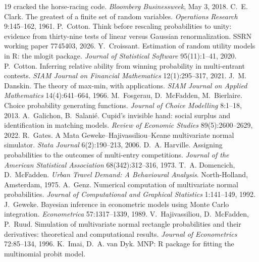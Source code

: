\documentclass[11pt]{article}
\begin{document}
\begin{thebibliography}{19}
cracked the horse-racing code. \emph{Bloomberg Businessweek}, May 3,
2018.
 C.~E. Clark.
The greatest of a finite set of random variables.
\emph{Operations Research} 9:145--162, 1961.
 P.~Cotton. Think before rescaling
probabilities to unity: evidence from thirty-nine tests of linear versus
Gaussian renormalization. SSRN working paper 7745403, 2026.
 Y.~Croissant.
Estimation of random utility models in R: the mlogit package.
\emph{Journal of Statistical Software} 95(11):1--41, 2020.
 P.~Cotton.
Inferring relative ability from winning probability in multi-entrant contests.
\emph{SIAM Journal on Financial Mathematics} 12(1):295--317, 2021.
 J.~M. Danskin. The theory of
max-min, with applications. \emph{SIAM Journal on Applied Mathematics}
14(4):641--664, 1966.
M.~Fosgerau, D.~McFadden, M.~Bierlaire. Choice probability generating
functions. \emph{Journal of Choice Modelling} 8:1--18, 2013.
 A.~Galichon,
B.~Salani\'e. Cupid's invisible hand: social surplus and identification in
matching models. \emph{Review of Economic Studies} 89(5):2600--2629, 2022.
 R.~Gates.
A Mata Geweke--Hajivassiliou--Keane multivariate normal simulator.
\emph{Stata Journal} 6(2):190--213, 2006.
 D.~A. Harville. Assigning
probabilities to the outcomes of multi-entry competitions.
\emph{Journal of the American Statistical Association}
68(342):312--316, 1973.
 T.~A. Domencich,
D.~McFadden. \emph{Urban Travel Demand: A Behavioural Analysis}.
North-Holland, Amsterdam, 1975.
 A.~Genz.
Numerical computation of multivariate normal probabilities.
\emph{Journal of Computational and Graphical Statistics} 1:141--149, 1992.
 J.~Geweke.
Bayesian inference in econometric models using Monte Carlo integration.
\emph{Econometrica} 57:1317--1339, 1989.
 V.~Hajivassiliou,
D.~McFadden, P.~Ruud. Simulation of multivariate normal rectangle probabilities
and their derivatives: theoretical and computational results.
\emph{Journal of Econometrics} 72:85--134, 1996.
 K.~Imai, D.~A. van Dyk.
MNP: R package for fitting the multinomial probit model.

\end{thebibliography}
\end{document}
